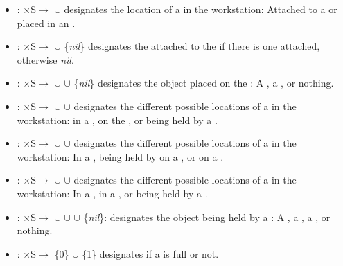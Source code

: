 \begin{itemize}
\item {}: $\mathrm{\times S\rightarrow}$ $\cup$  designates the location of a  in the workstation: Attached to a  or placed in an .

\item {}: $\mathrm{\times S\rightarrow}$ $\cup$ \{\textit{nil}\} designates the  attached to the  if there is one attached, otherwise \textit{nil}.

\item {}: $\mathrm{\times S\rightarrow}$ $\cup$  $\cup$ \{\textit{nil}\} designates the object placed on the : A , a , or nothing.

\item {}: $\mathrm{\times S\rightarrow}$ $\cup$  $\cup$  designates the different possible locations of a  in the workstation: in a , on the , or being held by a .

\item {}: $\mathrm{\times S\rightarrow}$ $\cup$  $\cup$  designates the different possible locations of a  in the workstation: In a , being held by on a , or on a .

\item {}: $\mathrm{\times S\rightarrow}$ $\cup$  $\cup$  designates the different possible locations of a  in the workstation: In a , in a , or being held by a .

\item {}: $\mathrm{\times S\rightarrow}$ $\cup$  $\cup$  $\cup$ \{\textit{nil}\}: designates the object being held by a : A , a , a , or nothing.

\item {}: $\mathrm{\times S\rightarrow}$ \{0\} $\cup$ \{1\} designates if a  is full or not.


\end{itemize}
